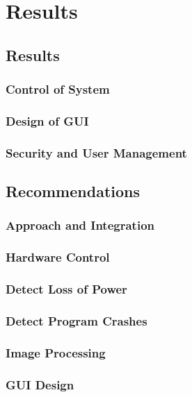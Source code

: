 \chapter{Results}

\section{Results}

\subsection{Control of System}

\subsection{Design of GUI}

\subsection{Security and User Management}


\section{Recommendations}

\subsection{Approach and Integration}

\subsection{Hardware Control}

\subsection{Detect Loss of Power}

\subsection{Detect Program Crashes}

\subsection{Image Processing}

\subsection{GUI Design}


